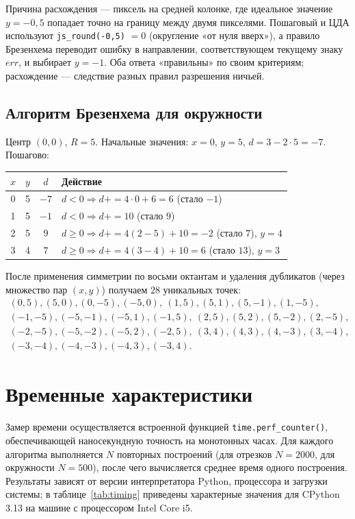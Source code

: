 \documentclass[a4paper,14pt]{extarticle}
\begin{document}
Причина расхождения — пиксель на средней колонке, где идеальное значение $y = -0{,}5$ попадает точно на границу между двумя пикселями. Пошаговый и ЦДА используют \texttt{js\_round(-0{,}5)} $= 0$ (округление «от нуля вверх»), а правило Брезенхема переводит ошибку в направлении, соответствующем текущему знаку $err$, и выбирает $y = -1$. Оба ответа «правильны» по своим критериям; расхождение — следствие разных правил разрешения ничьей.

\subsection{Алгоритм Брезенхема для окружности}
Центр $(0,0)$, $R=5$. Начальные значения: $x=0$, $y=5$, $d = 3 - 2\cdot5 = -7$.
Пошагово:
\begin{center}
\begin{tabular}{cccl}
\toprule
$x$ & $y$ & $d$ & Действие \\
\midrule
0 & 5 & $-7$  & $d<0 \Rightarrow d{+}{=}4\cdot0+6=6$ (стало $-1$) \\
1 & 5 & $-1$  & $d<0 \Rightarrow d{+}{=}10$ (стало $9$) \\
2 & 5 & $9$   & $d\ge0 \Rightarrow d{+}{=}4(2-5)+10=-2$ (стало $7$), $y{=}4$ \\
3 & 4 & $7$   & $d\ge0 \Rightarrow d{+}{=}4(3-4)+10=6$ (стало $13$), $y{=}3$ \\
\bottomrule
\end{tabular}
\end{center}

После применения симметрии по восьми октантам и удаления дубликатов (через множество пар $(x,y)$) получаем $28$ уникальных точек:
\begin{multline*}
(0,5), (5,0), (0,-5), (-5,0),\ (1,5), (5,1), (5,-1), (1,-5),\\
(-1,-5), (-5,-1), (-5,1), (-1,5),\ (2,5), (5,2), (5,-2), (2,-5),\\
(-2,-5), (-5,-2), (-5,2), (-2,5),\ (3,4), (4,3), (4,-3), (3,-4),\\
(-3,-4), (-4,-3), (-4,3), (-3,4).
\end{multline*}

\section{Временные характеристики}

Замер времени осуществляется встроенной функцией \texttt{time.perf\_counter()}, обеспечивающей наносекундную точность на монотонных часах. Для каждого алгоритма выполняется $N$ повторных построений (для отрезков $N = 2000$, для окружности $N = 500$), после чего вычисляется среднее время одного построения. Результаты зависят от версии интерпретатора Python, процессора и загрузки системы; в таблице~\ref{tab:timing} приведены характерные значения для CPython 3.13 на машине с процессором Intel Core i5.
\end{document}

